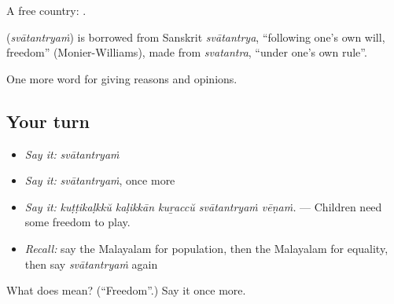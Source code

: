 A free country:  .

\begin{cousinweb}
\textbf{} (\emph{svātantryaṁ}) is borrowed from Sanskrit \emph{svātantrya}, \textquotedblleft{}following one's own will, freedom\textquotedblright{} (Monier-Williams), made from \emph{svatantra}, \textquotedblleft{}under one's own rule\textquotedblright{}.
\end{cousinweb}

\begin{grammarlens}[title={What you've built}]
One more word for giving reasons and opinions.
\end{grammarlens}

\subsection*{Your turn}
\begin{itemize}
\raggedright
  \item \emph{Say it:} \emph{svātantryaṁ}
  \item \emph{Say it:} \emph{svātantryaṁ}, once more
  \item \emph{Say it:} \emph{kuṭṭikaḷkkŭ kaḷikkān kuṟaccŭ svātantryaṁ vēṇaṁ.} — Children need some freedom to play.
  \item \emph{Recall:} say the Malayalam for population, then the Malayalam for equality, then say \emph{svātantryaṁ} again
\end{itemize}

\begin{tcolorbox}[breakable,colback=teal!4,colframe=teal!35!black,title={Before you move on}]
What does  mean? (\textquotedblleft{}Freedom\textquotedblright{}.) Say it once more.
\end{tcolorbox}
